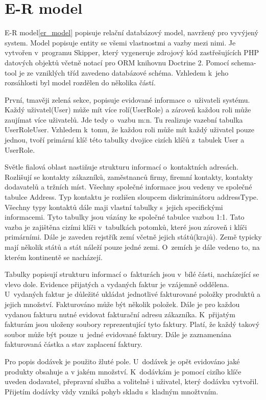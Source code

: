\documentclass[thesis=B,czech]{FITthesis}[2012/06/26]
\begin{document}
\section{E-R model}
	E-R model\ref{er_model} popisuje relační databázový model, navržený pro vyvýjený system. Model popisuje entity se všemi vlastnostmi a vazby mezi nimi. Je vytvořen v~programu Skipper, který vygeneruje zdrojový kód zastřešujících PHP datových objektů včetně notací pro ORM knihovnu Doctrine 2. Pomocí schema-tool je ze vzniklých tříd zavedeno databázové schéma. Vzhledem k~jeho rozsáhlosti byl model rozdělen do několika částí.
	
	První, tmavěji zelená sekce, popisuje evidované informace o~uživateli systému. Každý uživatel(User) může mít více rolí(UserRole) a zároveň každou roli může zaujímat více uživatelů. Jde tedy o~vazbu m:n. Tu realizuje vazební tabulka UserRoleUser. Vzhledem k~tomu, že každou roli může mít každý uživatel pouze jednou, tvoří primární klíč této tabulky dvojice cizích klíčů z~tabulek User a UserRole.
	
	Světle fialová oblast nastiňuje strukturu informací o~kontaktních adresách. Rozlišují se kontakty zákazníků, zaměstnanců firmy, firemní kontakty, kontakty dodavatelů a tržních míst. Všechny společné informace jsou vedeny ve společné tabulce Address. Typ kontaktu je rozlišen sloupcem diskriminátoru addressType. Všechny typy kontaktů dále maji vlastní tabulky s~jejich specifickými informacemi. Tyto tabulky jsou vázány ke společné tabulce vazbou 1:1. Tato vazba je zajištěna cizími klíči v~tabulkách potomků, které jsou zároveň i klíči primárními. Dále je zaveden rejstřík zemí včetně jejich států(krajů). Země typicky mají několik států a stát náleží pouze jedné zemi. O~zemích je dále vedeno to, na kterém kontinentě se nacházejí.
	
	Tabulky popisují strukturu informací o~fakturách jsou v~bílé části, nacházející se vlevo dole. Evidence přijatých a vydaných faktur je vzájemně oddělena. U~vydaných faktur je důležité ukládat jednotlivé fakturované položky produktů a jejich množství. Fakturováno může být několik položek. Dále je pro každou vydanou fakturu nutné evidovat fakturační adresu zákazníka. K~přijatým fakturám jsou uloženy soubory reprezentující tyto faktury. Platí, že každý takový soubor může být pouze u~jedné evidované faktury. Dále je zaznamenána fakturovaná částka a stav zaplacení faktury. 
	
	Pro popis dodávek je použito žluté pole. U~dodávek je opět evidováno jaké produkty obsahuje a v jakém množství. K~dodávkám je pomocí cizího klíče uveden dodavatel, přepravní služba a volitelně i uživatel, který dodávku vytvořil. Přijetím dodávky vždy vzniká pohyb skladu s~kladným množtvním.
	
\end{document}
